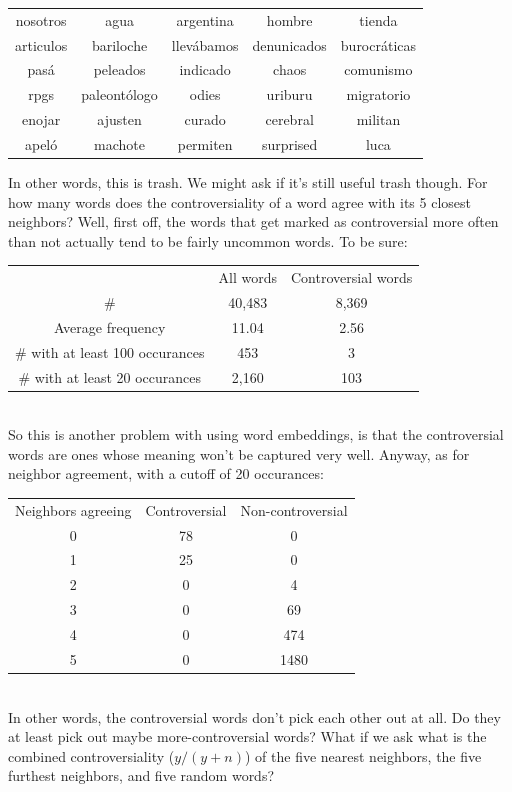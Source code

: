 \documentclass[11pt]{article} %
\begin{document}
\begin{tabular}{c|c|c|c|c}
\rowcolor{gray!50} nosotros & agua & argentina & hombre & tienda \\
articulos & bariloche & llev\'abamos & denunicados & burocr\'aticas \\ 
pas\'a & peleados & indicado & chaos & comunismo \\
rpgs & paleont\'ologo & odies & uriburu & migratorio \\
enojar & ajusten & curado & cerebral & militan \\
apel\'o & machote & permiten & surprised & luca \end{tabular}

In other words, this is trash. We might ask if it's still useful trash though. For how many words does the controversiality of a word agree with its 5 closest neighbors? Well, first off, the words that get marked as controversial more often than not actually tend to be fairly uncommon words. To be sure:
\\
\begin{tabular}{c|c|c}
\rowcolor{gray!50} & All words & Controversial words \\
\# & 40,483 & 8,369 \\
Average frequency & 11.04 & 2.56 \\
\# with at least 100 occurances & 453 & 3 \\
\# with at least 20 occurances & 2,160 & 103 \\\end{tabular}
\\
So this is another problem with using word embeddings, is that the controversial words are ones whose meaning won't be captured very well. Anyway, as for neighbor agreement, with a cutoff of 20 occurances: \\
\begin{tabular}{c|c|c}
\rowcolor{gray!50} Neighbors agreeing & Controversial & Non-controversial \\
0 & 78 & 0 \\
1 & 25 & 0 \\
2 & 0 & 4 \\
3 & 0 & 69 \\
4 & 0 & 474 \\
5 & 0 & 1480 \end{tabular}\\

In other words, the controversial words don't pick each other out at all. Do they at least pick out maybe more-controversial words? What if we ask what is the combined controversiality ($y/(y+n)$) of the five nearest neighbors, the five furthest neighbors, and five random words?
\end{document}
